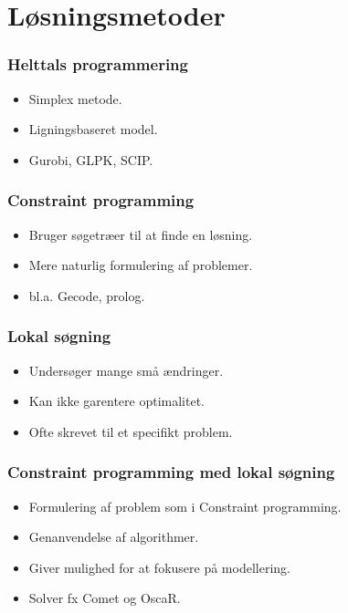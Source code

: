 \documentclass{beamer}
\begin{document}

\section{Løsningsmetoder}
\begin{frame}
\frametitle{Helttals programmering}
\begin{itemize}[<+->]  
\item Simplex metode.
\item Ligningsbaseret model.
\item Gurobi, GLPK, SCIP.
\end{itemize}
\begin{center}
\end{center}
\end{frame}


\begin{frame}
\frametitle{Constraint programming}
\begin{itemize}[<+->]
\item Bruger søgetræer til at finde en løsning.
\item Mere naturlig formulering af problemer.
\item bl.a. Gecode, prolog.
\end{itemize}
\end{frame}

\begin{frame}
\frametitle{Lokal søgning}
\begin{itemize}[<+->]
\item Undersøger mange små ændringer.
\item Kan ikke garentere optimalitet.
\item Ofte skrevet til et specifikt problem.
\end{itemize}
\end{frame}


\begin{frame}
\frametitle{Constraint programming med lokal søgning}
\begin{itemize}[<+->]
\item Formulering af problem som i Constraint programming. 
\item Genanvendelse af algorithmer.
\item Giver mulighed for at fokusere på modellering.
\item Solver fx Comet og OscaR.
\end{itemize}
\end{frame}
\end{document}
